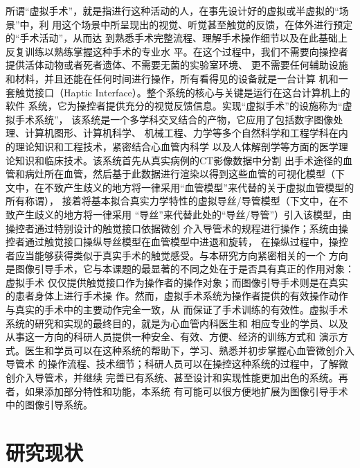 所谓“虚拟手术”，就是指进行这种活动的人，在事先设计好的虚拟或半虚拟的“场景”中，利
用这个场景中所呈现出的视觉、听觉甚至触觉的反馈，在体外进行预定的“手术活动”，从而达
到熟悉手术完整流程、理解手术操作细节以及在此基础上反复训练以熟练掌握这种手术的专业水
平。在这个过程中，我们不需要向操控者提供活体动物或者死者遗体、不需要无菌的实验室环境、
更不需要任何辅助设施和材料，并且还能在任何时间进行操作，所有看得见的设备就是一台计算
机和一套触觉接口（Haptic Interface）。整个系统的核心与关键是运行在这台计算机上的软件
系统，它为操控者提供充分的视觉反馈信息。实现“虚拟手术”的设施称为“虚拟手术系统”，
该系统是一个多学科交叉结合的产物，它应用了包括数字图像处理、计算机图形、计算机科学、
机械工程、力学等多个自然科学和工程学科在内的理论知识和工程技术，紧密结合心血管内科学
以及人体解剖学等方面的医学理论知识和临床技术。该系统首先从真实病例的CT影像数据中分割
出手术途径的血管和病灶所在血管，然后基于此数据进行渲染以得到这些血管的可视化模型（下
文中，在不致产生歧义的地方将一律采用“血管模型”来代替的关于虚拟血管模型的所有称谓），
接着将基本拟合真实力学特性的虚拟导丝/导管模型（下文中，在不致产生歧义的地方将一律采用
“导丝”来代替此处的“导丝/导管”）引入该模型，由操控者通过特别设计的触觉接口依据微创
介入导管术的规程进行操作；系统由操控者通过触觉接口操纵导丝模型在血管模型中进退和旋转，
在操纵过程中，操控者应当能够获得类似于真实手术的触觉感受。与本研究方向紧密相关的一个
方向是图像引导手术，它与本课题的最显著的不同之处在于是否具有真正的作用对象：虚拟手术
仅仅提供触觉接口作为操作者的操作对象；而图像引导手术则是在真实的患者身体上进行手术操
作。然而，虚拟手术系统为操作者提供的有效操作动作与真实的手术中的主要动作完全一致，从
而保证了手术训练的有效性。虚拟手术系统的研究和实现的最终目的，就是为心血管内科医生和
相应专业的学员、以及从事这一方向的科研人员提供一种安全、有效、方便、经济的训练方式和
演示方式。医生和学员可以在这种系统的帮助下，学习、熟悉并初步掌握心血管微创介入导管术
的操作流程、技术细节；科研人员可以在操控这种系统的过程中，了解微创介入导管术，并继续
完善已有系统、甚至设计和实现性能更加出色的系统。再者，如果添加部分特性和功能，本系统
有可能可以很方便地扩展为图像引导手术中的图像引导系统。

\section{研究现状}


